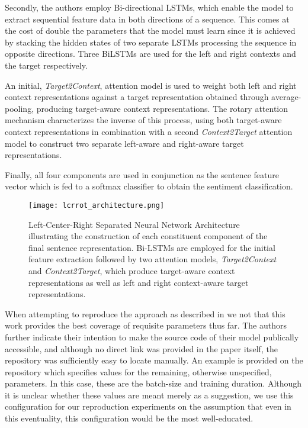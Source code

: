 \documentclass[../../fyp.tex]{subfiles}
\begin{document}
Secondly, the authors employ Bi-directional LSTMs, which enable the model to extract sequential feature data in both directions of a sequence. This comes at the cost of double the parameters that the model must learn since it is achieved by stacking the hidden states of two separate LSTMs processing the sequence in opposite directions. Three BiLSTMs are used for the left and right contexts and the target respectively. 

An initial, \textit{Target2Context}, attention model is used to weight both left and right context representations against a target representation obtained through average-pooling, producing target-aware context representations. The rotary attention mechanism characterizes the inverse of this process, using both target-aware context representations in combination with a second \textit{Context2Target} attention model to construct two separate left-aware and right-aware target representations. 

Finally, all four components are used in conjunction as the sentence feature vector which is fed to a softmax classifier to obtain the sentiment classification. 
\begin{figure}[!ht]
	\centering
	\texttt{[image: lcrrot\_architecture.png]}
	\caption{Left-Center-Right Separated Neural Network Architecture \cite{zheng2018} illustrating the construction of each constituent component of the final sentence representation. Bi-LSTMs are employed for the initial feature extraction followed by two attention models, \textit{Target2Context} and \textit{Context2Target}, which produce target-aware context representations as well as left and right context-aware target representations.}
	\label{fig:ffnn}
\end{figure}

When attempting to reproduce the approach as described in \cite{zheng2018} we not that this work provides the best coverage of requisite parameters thus far. The authors further indicate their intention to make the source code of their model publically accessible, and although no direct link was provided in the paper itself, the repository was sufficiently easy to locate manually. An example is provided on the repository which specifies values for the remaining, otherwise unspecified, parameters. In this case, these are the batch-size and training duration. Although it is unclear whether these values are meant merely as a suggestion, we use this configuration for our reproduction experiments on the assumption that even in this eventuality, this configuration would be the most well-educated.   
\end{document}
